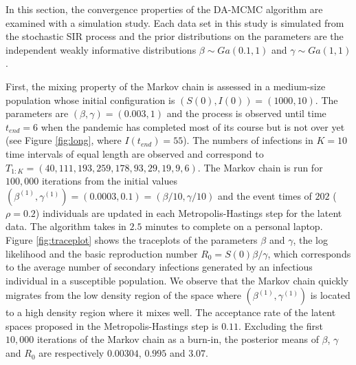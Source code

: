 \documentclass[11pt]{article}
\begin{document}
	
	
	
	In this section, the convergence properties of the DA-MCMC algorithm are examined with a simulation study. Each data set in this study is simulated from the stochastic SIR process and the prior distributions on the parameters are the independent weakly informative distributions $\beta \sim Ga(0.1, 1)$ and $\gamma \sim Ga(1,1)$.
	
	First, the mixing property of the Markov chain is assessed in a medium-size population whose initial configuration is $(S(0), I(0)) = (1000, 10)$. The parameters are $(\beta, \gamma) = (0.003, 1)$ and the process is observed until time $t_{end} = 6$ when the pandemic has completed most of its course but is not over yet (see Figure \ref{fig:long}, where $I(t_{end}) = 55$). The numbers of infections in $K = 10$ time intervals of equal length are observed and correspond to $T_{1:K} = (40, 111, 193, 259, 178, 93, 29, 19, 9, 6)$.
	The Markov chain is run for $100,000$ iterations from the initial values $(\beta^{(1)}, \gamma^{(1)}) = (0.0003, 0.1) = (\beta/10, \gamma/10)$ and the event times of $202$ ($\rho = 0.2$) individuals are updated in each Metropolis-Hastings step for the latent data. The algorithm takes in $2.5$ minutes to complete on a personal laptop. 
	Figure \ref{fig:traceplot} shows the traceplots of the parameters $\beta$ and $\gamma$, the log likelihood and the basic reproduction number $R_0 = S(0) \beta / \gamma$, which corresponds to the average number of secondary infections generated by an infectious individual in a susceptible population. We observe that the Markov chain quickly migrates from the low density region of the space where $(\beta^{(1)}, \gamma^{(1)})$ is located to a high density region where it mixes well. The acceptance rate of the latent spaces proposed in the Metropolis-Hastings step is $0.11$.
	Excluding the first $10,000$ iterations of the Markov chain as a burn-in, the posterior means of $\beta$, $\gamma$ and $R_0$ are respectively $0.00304$, $0.995$ and $3.07$.
	
\end{document}
